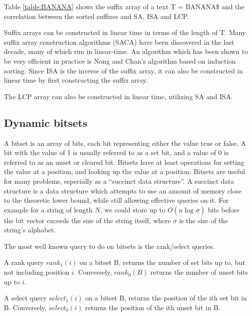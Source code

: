 Table \ref{table:BANANA} shows the suffix array of a text T = BANANA\$ and the correlation
between the sorted suffixes and SA, ISA and LCP.


Suffix arrays can be constructed in linear time in terms of the length of T. Many suffix
array construction algorithms (SACA) have been discovered in the last
decade\cite{SuffixArrayConstruction}, many of which run in linear-time. An algorithm which
has been shown to be very efficient in practice is Nong and
Chan's\cite{LinearTimeSuffixArraySAIS} algorithm based on induction sorting. Since ISA is
the inverse of the suffix array, it can also be constructed in linear time by first
constructing the suffix array.

The LCP array can also be constructed in linear time, utilizing SA and ISA.



\subsection{Dynamic bitsets}

A bitset is an array of bits, each bit representing either the value true or false. A bit
with the value of 1 is usually referred to as a set bit, and a value of 0 is referred to
as an unset or cleared bit. Bitsets have at least operations for setting the value at a
position, and looking up the value at a position. Bitsets are useful for many problems,
especially as a ``succinct data structure''. A succinct data structure is a data structure
which attempts to use an amount of memory close to the theoretic lower bound, while still
allowing effective queries on it. For example for a string of length $N$, we could store
up to $O(n \log_{}\sigma)$ bits before the bit vector exceeds the size of the string
itself, where $\sigma$ is the size of the string's alphabet.

The most well known query to do on bitsets is the rank/select queries.

\begin{definition}
    A rank query $rank_1(i)$ on a bitset B, returns the number of set bits
    up to, but not including position $i$. Conversely, $rank_0(B)$ returns the number of
    unset bits up to $i$.
\end{definition}
\begin{definition}
    A select query $select_1(i)$ on a bitset B, returns the position of the ith
    set bit in B. Conversely, $select_0(i)$ returns the position of the ith unset bit in
    B.
\end{definition}

